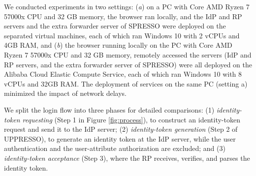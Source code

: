 We conducted experiments in two settings: (\emph{a}) on a PC with Core AMD Ryzen 7 57000x CPU and 32 GB memory, the browser ran locally, and the IdP and RP servers and the extra forwarder server of SPRESSO were deployed on the separated virtual machines, each of which ran Windows 10 with 2 vCPUs and 4GB RAM, and (\emph{b}) the browser running locally on the PC with Core AMD Ryzen 7 57000x CPU and 32 GB memory, remotely accessed the servers (IdP and RP servers, and the extra forwarder server of SPRESSO) were all deployed on the Alibaba Cloud Elastic Compute Service, each of which ran Windows 10 with 8 vCPUs and 32GB RAM. 
The deployment of services on the same PC (setting a) minimized the impact of network delays.




 We split the login flow into three phases for detailed comparisons: (1)
{\em identity-token requesting} (Step 1 in Figure \ref{fig:process}), to construct an identity-token request and send it to the IdP server; (2) {\em identity-token generation} (Step 2 of UPPRESSO), to generate an identity token at the IdP server, while the user authentication and the user-attribute authorization are excluded; and (3) {\em identity-token acceptance} (Step 3), where the RP receives, verifies, and parses the identity token.



